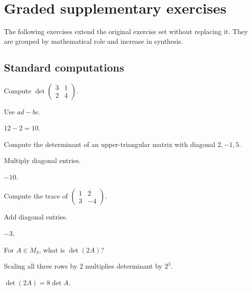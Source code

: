 \section{Graded supplementary exercises}
The following exercises extend the original exercise set without replacing it. They are grouped by mathematical role and increase in synthesis.

\subsection*{Standard computations}

\begin{exercise}\label{exr:i08-expand-01}
Compute \(\det\begin{pmatrix}3&1\\2&4\end{pmatrix}\).
\end{exercise}
\begin{hint}
Use \(ad-bc\).
\end{hint}
\begin{solution}
\(12-2=10\).
\end{solution}

\begin{exercise}\label{exr:i08-expand-02}
Compute the determinant of an upper-triangular matrix with diagonal \(2,-1,5\).
\end{exercise}
\begin{hint}
Multiply diagonal entries.
\end{hint}
\begin{solution}
\(-10\).
\end{solution}

\begin{exercise}[Trace]\label{exr:i08-expand-03}
Compute the trace of \(\begin{pmatrix}1&2\\3&-4\end{pmatrix}\).
\end{exercise}
\begin{hint}
Add diagonal entries.
\end{hint}
\begin{solution}
\(-3\).
\end{solution}

\begin{exercise}\label{exr:i08-expand-04}
For \(A\in M_3\), what is \(\det(2A)\)?
\end{exercise}
\begin{hint}
Scaling all three rows by \(2\) multiplies determinant by \(2^3\).
\end{hint}
\begin{solution}
\(\det(2A)=8\det A\).
\end{solution}

